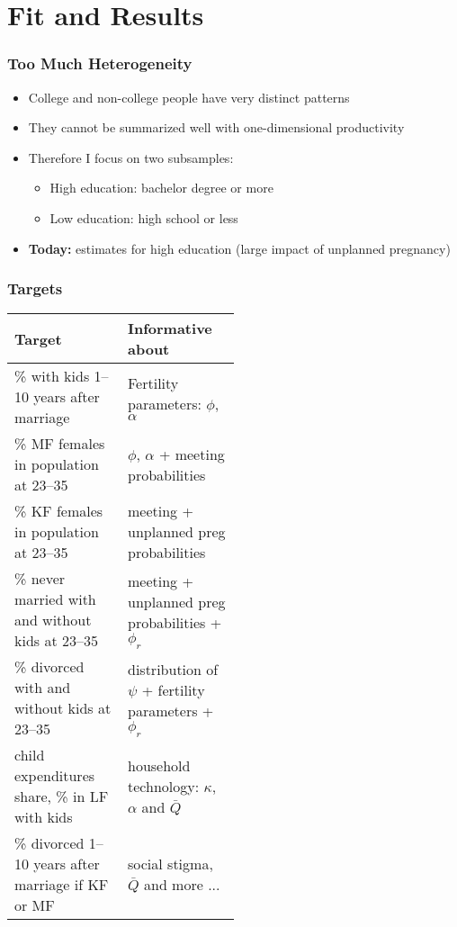 \documentclass[aspectratio=169]{beamer}
\let\olditem\item
\renewcommand{\item}{%
\olditem\vspace{\fill}}
\begin{document}
\section{Fit and Results}

\begin{frame}
\frametitle{Too Much Heterogeneity}
\begin{itemize}
\item College and non-college people have very distinct patterns
\item They cannot be summarized well with one-dimensional productivity
\item Therefore I focus on two subsamples:
\begin{itemize}
\item High education: bachelor degree or more
\item Low education: high school or less
\end{itemize}
\item \textbf{Today:} estimates for high education (large impact of unplanned pregnancy)%
\end{itemize}
\end{frame}

\begin{frame}
\frametitle{Targets}
\begin{tabular}{l p{0.5\linewidth}}\hline
\multicolumn{1}{l}{Target} & \multicolumn{1}{l}{Informative about} \\\hline
\footnotesize \% with kids 1--10 years after marriage & \footnotesize  Fertility parameters: $\phi$, $\alpha$ \\
\footnotesize \% MF females in population at 23--35 & \footnotesize  $\phi$, $\alpha$ + meeting probabilities \\
\footnotesize \% KF females in population at 23--35 &\footnotesize   meeting + unplanned preg probabilities\\
\footnotesize \% never married with and without kids at 23--35 & \footnotesize  meeting + unplanned preg probabilities + $\phi_r$\\
\footnotesize \% divorced with and without kids at 23--35 & \footnotesize  distribution of $\psi$ + fertility parameters + $\phi_r$ \\
\footnotesize child expenditures share, \% in LF with kids & \footnotesize  household technology: $\kappa$, $\alpha$ and $\bar{Q}$ \\
\footnotesize \% divorced 1--10 years after marriage if KF or MF & \footnotesize  social stigma, $\bar{Q}$ and more ... \\\hline
\end{tabular}
\end{frame}
\end{document}
